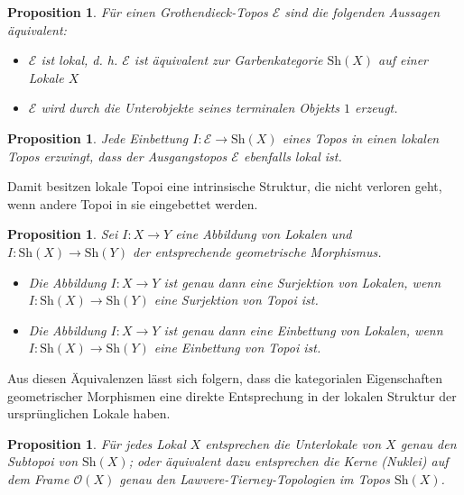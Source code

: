 \documentclass{article}
\newtheorem{proposition}[satz]{Proposition}
\begin{document}
\begin{proposition}
Für einen Grothendieck-Topos $\mathcal{E}$ sind die folgenden Aussagen äquivalent:  
\begin{itemize}
\item $ \mathcal{E} $ ist lokal, d. h. $ \mathcal{E} $ ist äquivalent zur Garbenkategorie $\text{Sh}(X)$ auf einer Lokale $X$
\item $ \mathcal{E} $ wird durch die Unterobjekte seines terminalen Objekts $ 1 $ erzeugt.  
\end{itemize}
\end{proposition}

\begin{proposition}
Jede Einbettung $I: \mathcal{E} \to \text{Sh}(X) $ eines Topos in einen lokalen Topos erzwingt, dass der Ausgangstopos $ \mathcal{E} $ ebenfalls lokal ist.
\end{proposition}

Damit besitzen lokale Topoi eine intrinsische Struktur, die nicht verloren geht, wenn andere Topoi in sie eingebettet werden.
\begin{proposition}
    Sei $ I: X \to Y $ eine Abbildung von Lokalen und $ I: \text{Sh}(X) \to \text{Sh}(Y) $ der entsprechende geometrische Morphismus.  
\begin{itemize}

\item Die Abbildung $ I: X \to Y $ ist genau dann eine Surjektion von Lokalen, wenn $ I: \text{Sh}(X) \to \text{Sh}(Y) $ eine Surjektion von Topoi ist.  

\item Die Abbildung $ I: X \to Y$ ist genau dann eine Einbettung von Lokalen, wenn $ I: \text{Sh}(X) \to \text{Sh}(Y) $ eine Einbettung von Topoi ist. 
\end{itemize}
\end{proposition}

Aus diesen Äquivalenzen lässt sich folgern, dass die kategorialen Eigenschaften geometrischer Morphismen eine direkte Entsprechung in der lokalen Struktur der ursprünglichen Lokale haben.

\begin{proposition}\label{prop24}
    Für jedes Lokal $ X $ entsprechen die Unterlokale von $ X $ genau den Subtopoi von $ \text{Sh}(X) $; oder äquivalent dazu entsprechen die Kerne (Nuklei) auf dem Frame $ \mathcal{O}(X) $ genau den Lawvere-Tierney-Topologien im Topos $ \text{Sh}(X) $.
\end{proposition}
\end{document}
